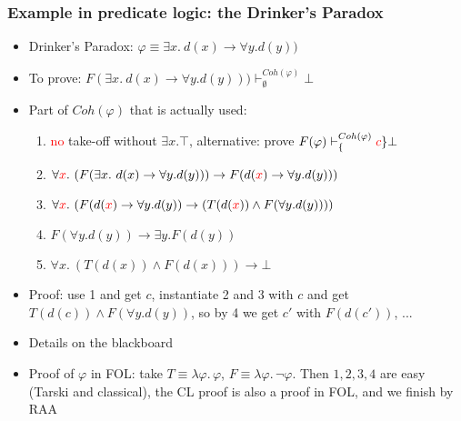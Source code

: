 \documentclass[handout,11pt]{beamer}
\newcommand{\red}[1]{\textcolor{red}{#1}}
\newcommand{\set}[1]{\{#1\}}
\newcommand{\imp}{\rightarrow}
\begin{document}
\begin{frame}
\frametitle{Example in predicate logic: the Drinker's Paradox}
 \begin{itemize}[<+->] 
    \item Drinker's Paradox: $\varphi\equiv\exists x.~d(x)\to \forall y.d(y))$
    \item To prove: $F(\exists x.~d(x)\to \forall y.d(y))) 
    \vdash^{Coh(\varphi)}_\emptyset\bot$    
    \item Part of $Coh(\varphi)$ that is actually used:
    \begin{enumerate}[<+->]
    	\item \red{no} take-off without $\exists x. \top$, 
    	alternative: prove $F(\varphi)\vdash^{Coh(\varphi)}_\set{\red{c}}\bot$
    	\item $\forall\red{x}.~( F(\exists x.~d(x)\to \forall y.d(y))) \imp 
    	F(d(\red{x})\to \forall y.d(y)))$
    	\item $\forall\red{x}.~(F(d(\red{x})\to \forall y.d(y)) \imp 
    	(T(d(\red{x})) \wedge F(\forall y.d(y))))$
    	\item $F(\forall y.d(y)) \imp \exists y. F(d(y))$
    	\item $\forall x.~(T(d(x)) \wedge F(d(x))) \imp \bot$   	
    \end{enumerate}
    \item Proof: use 1 and get $c$, instantiate 2 and 3 with $c$
    and get $T(d(c)) \wedge F(\forall y.d(y))$, so by 4 we get $c'$
    with $F(d(c'))$, ...
    \item Details on the blackboard    
    \item Proof of $\varphi$ in FOL: take $T\equiv\lambda\varphi.\,\varphi$,
     $F\equiv\lambda\varphi.\,\neg\varphi$. Then $1,2,3,4$ are easy
     (Tarski and classical), the CL proof is also a proof in FOL,
     and we finish by RAA
 \end{itemize}
\end{frame}
\end{document}

